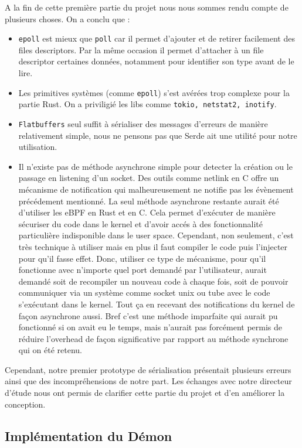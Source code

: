 \documentclass{article}
\begin{document}
A la fin de cette première partie du projet nous nous sommes rendu compte de plusieurs choses. On a conclu que : 
\begin{itemize}
    \item \texttt{epoll} est mieux que \texttt{poll} car il permet d'ajouter et de retirer facilement des files descriptors. Par la même occasion il permet d’attacher à un file descriptor certaines données, notamment pour identifier son type avant de le lire.
    \item Les primitives systèmes (comme \texttt{epoll}) s'est avérées trop complexe pour la partie Rust. On a priviligié les libs comme \texttt{tokio, netstat2, inotify}.
    \item \texttt{Flatbuffers} seul suffit à sérialiser des messages d’erreurs de manière relativement simple, nous ne pensons pas que Serde ait une utilité pour notre utilisation.
    \item Il n'existe pas de méthode asynchrone simple pour detecter la création ou le passage en listening d'un socket. Des outils comme netlink en C offre un mécanisme de notification qui malheureusement ne notifie pas les évènement précédement mentionné. La seul méthode asynchrone restante aurait été d'utiliser les eBPF en Rust et en C. Cela permet d'exécuter de manière sécuriser du code dans le kernel et d'avoir accés à des fonctionnalité particulière indisponible dans le user space. Cependant, non seulement, c'est très technique à utiliser mais en plus il faut compiler le code puis l'injecter pour qu'il fasse effet. Donc, utiliser ce type de mécanisme, pour qu'il fonctionne avec n'importe quel port demandé par l'utilisateur, aurait demandé soit de recompiler un nouveau code à chaque fois, soit de pouvoir communiquer via un système comme socket unix ou tube avec le code s'exécutant dans le kernel. Tout ça en recevant des notifications du kernel de façon asynchrone aussi. Bref c'est une méthode imparfaite qui aurait pu fonctionné si on avait eu le temps, mais n'aurait pas forcément permis de réduire l'overhead de façon significative par rapport au méthode synchrone qui on été retenu.
\end{itemize}

Cependant, notre premier prototype de sérialisation présentait plusieurs erreurs ainsi que des incompréhensions de notre part. Les échanges avec notre directeur d’étude nous ont permis de clarifier cette partie du projet et d’en améliorer la conception.

\subsection{Implémentation du Démon}
\end{document}
